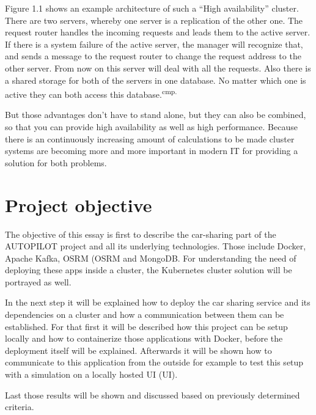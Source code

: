 Figure 1.1 shows an example architecture of such a ``High availability'' cluster. There are two servers, whereby one server is a replication of the other one. The request router handles the incoming requests and leads them to the active server. If there is a system failure of the active server, the manager will recognize that, and sends a message to the request router to change the request address to the other server. From now on this server will deal with all the requests. Also there is a shared storage for both of the servers in one database. No matter which one is active they can both access this database.\textsuperscript{cmp.\cite{10}}


But those advantages don't have to stand alone, but they can also be combined, so that you can provide high availability as well as high performance. Because there is an continuously increasing amount of calculations to be made cluster systems are becoming more and more important in modern IT for providing a solution for both problems.

\section{Project objective}

The objective of this essay is first to describe the car-sharing part of the AUTOPILOT project and all its underlying technologies. Those include Docker, Apache Kafka, \acs{OSRM} (\acl{OSRM} and MongoDB.  For understanding the need of deploying these apps inside a cluster, the Kubernetes cluster solution will be portrayed as well.

In the next step it will be explained how to deploy the car sharing service and its dependencies on a cluster and how a communication between them can be established. For that first it will be described how this project can be setup locally and how to containerize those applications with Docker, before the deployment itself will be explained. Afterwards it will be shown how to communicate to this application from the outside for example to test this setup with a simulation on a locally hosted \acs{UI} (\acl{UI}).

Last those results will be shown and discussed based on previously determined criteria. 


